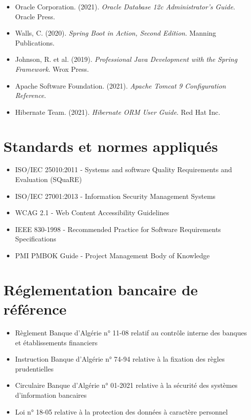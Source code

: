 \begin{itemize}
    \item Oracle Corporation. (2021). \textit{Oracle Database 12c Administrator's Guide}. Oracle Press.
    \item Walls, C. (2020). \textit{Spring Boot in Action, Second Edition}. Manning Publications.
    \item Johnson, R. et al. (2019). \textit{Professional Java Development with the Spring Framework}. Wrox Press.
    \item Apache Software Foundation. (2021). \textit{Apache Tomcat 9 Configuration Reference}.
    \item Hibernate Team. (2021). \textit{Hibernate ORM User Guide}. Red Hat Inc.
\end{itemize}

\section{Standards et normes appliqués}

\begin{itemize}
    \item ISO/IEC 25010:2011 - Systems and software Quality Requirements and Evaluation (SQuaRE)
    \item ISO/IEC 27001:2013 - Information Security Management Systems
    \item WCAG 2.1 - Web Content Accessibility Guidelines
    \item IEEE 830-1998 - Recommended Practice for Software Requirements Specifications
    \item PMI PMBOK Guide - Project Management Body of Knowledge
\end{itemize}

\section{Réglementation bancaire de référence}

\begin{itemize}
    \item Règlement Banque d'Algérie n° 11-08 relatif au contrôle interne des banques et établissements financiers
    \item Instruction Banque d'Algérie n° 74-94 relative à la fixation des règles prudentielles
    \item Circulaire Banque d'Algérie n° 01-2021 relative à la sécurité des systèmes d'information bancaires
    \item Loi n° 18-05 relative à la protection des données à caractère personnel
\end{itemize}

